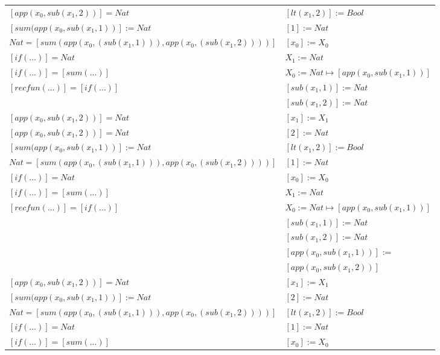 \begin{exercise}
\begin{description}
\begin{center}
\begin{longtable}{ | l | l | }
                        $[app(x_0, sub(x_1,2))] = Nat$ & $[lt(x_1 , 2)] := Bool$\\
                        $[sum(app(x_0, sub(x_1,1))] := Nat$ &    $[1] := Nat$\\ 
                        $Nat = [sum(app(x_0, (sub(x_1,1))), app(x_0, (sub(x_1,2))))]$ &  $[x_0] := X_0$\\
                        $[if(...)] = Nat$ &  $X_1 := Nat$\\ 
                        $[if(...)] = [sum(...)]$ &  $X_0 := Nat \mapsto [app(x_0, sub(x_1,1))]$\\ 
                        $[recfun(...)] = [if(...)]$ &  $[sub(x_1,1)] := Nat$\\ 
                        & $[sub(x_1,2)] := Nat$ \\
                    \hline
                        $[app(x_0, sub(x_1,2))] = Nat$ &  $[x_1] := X_1$\\
                        $[app(x_0, sub(x_1,2))] = Nat$ &   $[2] := Nat$\\  
                        $[sum(app(x_0, sub(x_1,1))] := Nat$ & $[lt(x_1 , 2)] := Bool$\\ 
                        $Nat = [sum(app(x_0, (sub(x_1,1))), app(x_0, (sub(x_1,2))))]$ &    $[1] := Nat$\\
                        $[if(...)] = Nat$ &  $[x_0] := X_0$\\ 
                        $[if(...)] = [sum(...)]$ &  $X_1 := Nat$\\ 
                        $[recfun(...)] = [if(...)]$ &  $X_0 := Nat \mapsto [app(x_0, sub(x_1,1))]$\\ 
                        &  $[sub(x_1,1)] := Nat$\\ 
                        &  $[sub(x_1,2)] := Nat$ \\
			     &  $[app(x_0, sub(x_1,1))]$ := \\
			     &  $[app(x_0, sub(x_1,2))]$\\
                    \hline
                        $[app(x_0, sub(x_1,2))] = Nat$ &  $[x_1] := X_1$\\   
                        $[sum(app(x_0, sub(x_1,1))] := Nat$ &  $[2] := Nat$\\
                        $Nat = [sum(app(x_0, (sub(x_1,1))), app(x_0, (sub(x_1,2))))]$ & $[lt(x_1 , 2)] := Bool$\\
                        $[if(...)] = Nat$ &   $[1] := Nat$\\ 
                        $[if(...)] = [sum(...)]$ & $[x_0] := X_0$\\

\end{longtable}
\end{center}
\end{description}
\end{exercise}
